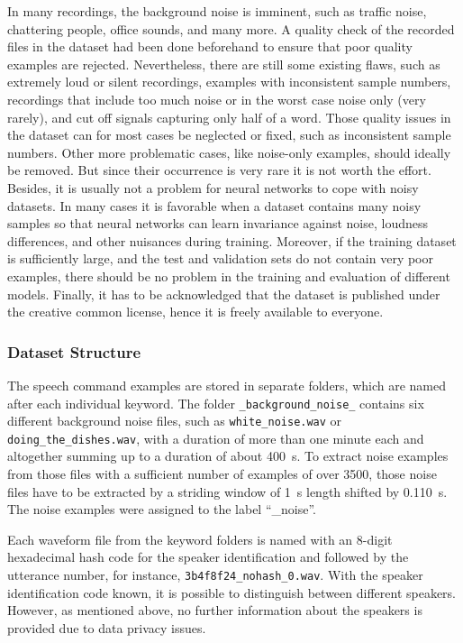 In many recordings, the background noise is imminent, such as traffic noise, chattering people, office sounds, and many more.
A quality check of the recorded files in the dataset had been done beforehand to ensure that poor quality examples are rejected.
Nevertheless, there are still some existing flaws, such as extremely loud or silent recordings, examples with inconsistent sample numbers, recordings that include too much noise or in the worst case noise only (very rarely), and cut off signals capturing only half of a word.
Those quality issues in the dataset can for most cases be neglected or fixed, such as inconsistent sample numbers. 
Other more problematic cases, like noise-only examples, should ideally be removed.
But since their occurrence is very rare it is not worth the effort.
Besides, it is usually not a problem for neural networks to cope with noisy datasets.
In many cases it is favorable when a dataset contains many noisy samples so that neural networks can learn invariance against noise, loudness differences, and other nuisances during training.
Moreover, if the training dataset is sufficiently large, and the test and validation sets do not contain very poor examples, there should be no problem in the training and evaluation of different models.
Finally, it has to be acknowledged that the dataset is published under the creative common license, hence it is freely available to everyone.



\subsubsection{Dataset Structure}\label{sec:exp_dataset_structure}
The speech command examples are stored in separate folders, which are named after each individual keyword.
The folder \texttt{\_background\_noise\_} contains six different background noise files, such as \texttt{white\_noise.wav} or \texttt{doing\_the\_dishes.wav}, with a duration of more than one minute each and altogether summing up to a duration of about \SI{400}{s}.
To extract noise examples from those files with a sufficient number of examples of over 3500, those noise files have to be extracted by a striding window of \SI{1}{\second} length shifted by \SI{0.110}{\second}.
The noise examples were assigned to the label \enquote{\_noise}.

Each waveform file from the keyword folders is named with an 8-digit hexadecimal hash code for the speaker identification and followed by the utterance number, for instance, \texttt{3b4f8f24\_nohash\_0.wav}.
With the speaker identification code known, it is possible to distinguish between different speakers.
However, as mentioned above, no further information about the speakers is provided due to data privacy issues.

